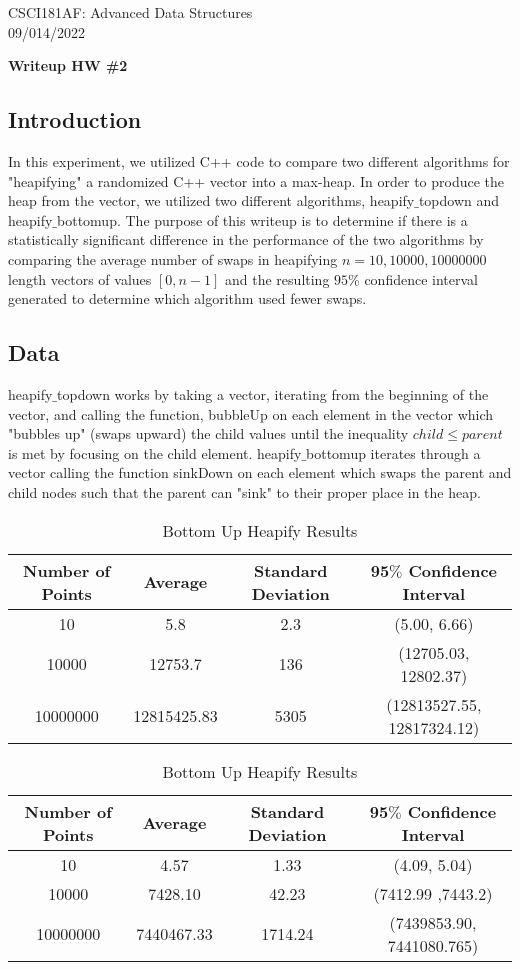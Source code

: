 \documentclass[11pt]{article}
\begin{document}
CSCI181AF: Advanced Data Structures\\
09/014/2022
\begin{center}
    \bf{Writeup HW \#2}
\end{center}
\subsection*{Introduction}
In this experiment, we utilized C++ code to compare two different algorithms for "heapifying" a randomized C++ vector into a max-heap. 
In order to produce the heap from the vector, we utilized two different algorithms, heapify$\_$topdown and heapify$\_$bottomup. The purpose of this writeup is to determine if there is a statistically significant difference in the performance of the 
two algorithms by comparing the average number of swaps in heapifying $n = 10, 10000, 10000000$ length vectors of values $[0, n-1]$ and the resulting $95\%$ confidence interval generated to determine which algorithm used fewer swaps.

\subsection*{Data}
heapify$\_$topdown works by taking a vector, iterating from the beginning of the vector, and calling the function, bubbleUp on each element in the vector which "bubbles up" (swaps upward) the child values until the inequality $child \leq parent$ is met by focusing on the child element. heapify$\_$bottomup iterates through a vector calling the function sinkDown on each element which swaps the parent and child nodes such that the parent can "sink" to their proper place in the heap.
\begin{table}[ht]
    \centering
    \begin{tabular}{|c c c c|} 
        \hline
        Number of Points & Average & Standard Deviation & 95$\%$ Confidence Interval \\ [0.5ex] 
        \hline
        10 & 5.8 & 2.3 & (5.00, 6.66) \\ 
        \hline
        10000& 12753.7 & 136 & (12705.03, 12802.37) \\
        \hline
        10000000 & 12815425.83 & 5305 & (12813527.55, 12817324.12) \\[1ex]
        \hline
       \end{tabular}
    \caption{Top Down Heapify Results}
    \centering
    \begin{tabular}{|c c c c|} 
        \hline
        Number of Points & Average & Standard Deviation & 95$\%$ Confidence Interval\\ [0.5ex] 
        \hline
        10 & 4.57 & 1.33 & (4.09, 5.04) \\ 
        \hline
        10000 & 7428.10 & 42.23 & (7412.99 ,7443.2) \\
        \hline
        10000000 & 7440467.33 & 1714.24 & (7439853.90, 7441080.765) \\ [1ex] 
        \hline
       \end{tabular}
    \caption{Bottom Up Heapify Results}
\end{table}
\end{document}
